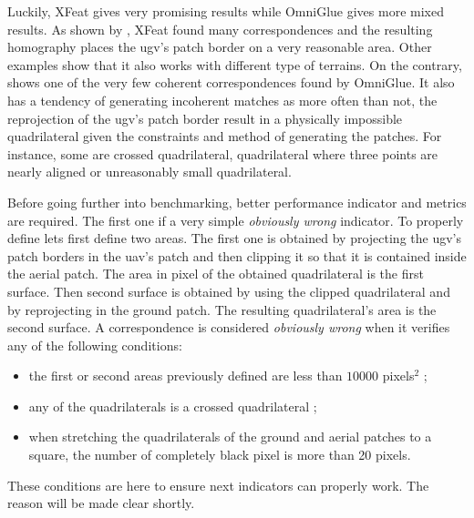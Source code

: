 Luckily, XFeat gives very promising results while OmniGlue gives more mixed results.
As shown by , XFeat found many correspondences and the resulting homography places
the \gls{ugv}'s patch border on a very reasonable area.
Other examples show that it also works with different type of terrains. %
On the contrary,  shows one of the very few coherent correspondences found by OmniGlue.
It also has a tendency of generating incoherent matches as more often than not, the reprojection of the \gls{ugv}'s patch
border result in a physically impossible quadrilateral given the constraints and method of generating the patches.
For instance, some are crossed quadrilateral, quadrilateral where three points are nearly aligned or unreasonably small quadrilateral.


Before going further into benchmarking, better performance indicator and metrics are required.
The first one if a very simple \textit{obviously wrong} indicator.
To properly define lets first define two areas.
The first one is obtained by projecting the \gls{ugv}'s patch borders in the \gls{uav}'s patch and then clipping it so that it
is contained inside the aerial patch.
The area in pixel of the obtained quadrilateral is the first surface.
Then second surface is obtained by using the clipped quadrilateral and by reprojecting in the ground patch.
The resulting quadrilateral's area is the second surface.
A correspondence is considered \textit{obviously wrong} when it verifies any of the following conditions:
\begin{itemize}
    \item the first or second areas previously defined are less than $10000$ pixels$^2$ ;
    \item any of the quadrilaterals is a crossed quadrilateral ;
    \item when stretching the quadrilaterals of the ground and aerial patches to a square, the number of completely black pixel is more than 20 pixels.
\end{itemize}
These conditions are here to ensure next indicators can properly work.
The reason will be made clear shortly.


